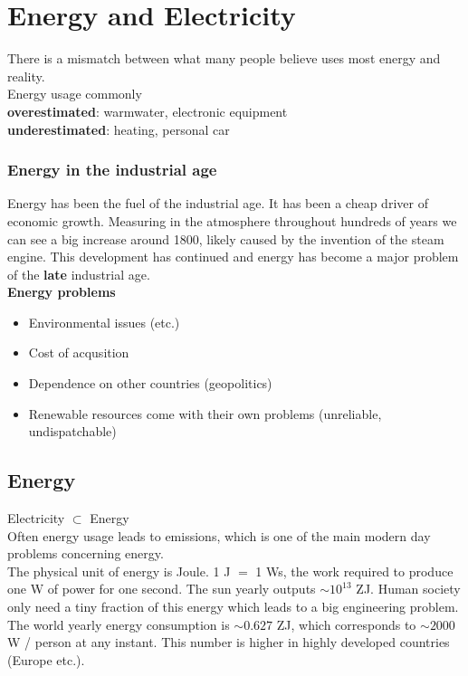 \section{Energy and Electricity}
There is a mismatch between what many people believe uses most energy and reality.\\
Energy usage commonly\\
\textbf{overestimated}: warmwater, electronic equipment\\
\textbf{underestimated}: heating, personal car\\

\subsubsection{Energy in the industrial age}
Energy has been the fuel of the industrial age.
It has been a cheap driver of economic growth.
Measuring \cotwo in the atmosphere throughout hundreds of years we can see a big increase around 1800, likely caused by the invention of the steam engine. This development has continued and energy has become a major problem of the \textbf{late} industrial age.\\

\textbf{Energy problems}
\begin{itemize}
    \item Environmental issues (\cotwo etc.)
    \item Cost of acqusition
    \item Dependence on other countries (geopolitics)
    \item Renewable resources come with their own problems (unreliable, undispatchable)
\end{itemize}

\subsection{Energy}
Electricity $\subset$ Energy\\

Often energy usage leads to \cotwo emissions, which is one of the main modern day problems concerning energy.\\

The physical unit of energy is Joule. 1 J $=$ 1 Ws, the work required to produce one W of power for one second.
The sun yearly outputs $\sim 10^{13}$ ZJ.
Human society only need a tiny fraction of this energy which leads to a big engineering problem.
The world yearly energy consumption is $\sim 0.627$ ZJ, which corresponds to $\sim 2000$ W / person at any instant.
This number is higher in highly developed countries (Europe etc.).\\

